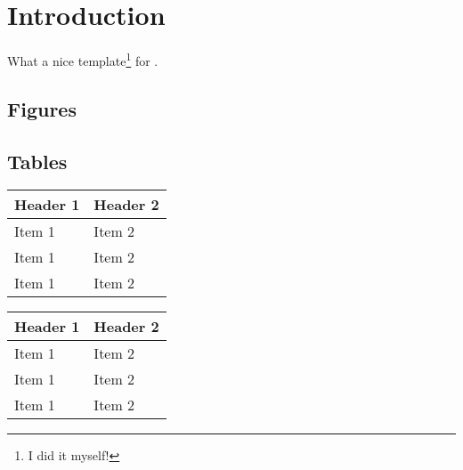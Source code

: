 \section*{Introduction}

What a nice template\footnote{I did it myself!} for \citep{Rougier:2017}.

\subsection*{Figures}

\begin{figure}[htbp]
    \label{fig:1}
\end{figure}

\subsection*{Tables}
\begin{table}[htbp]
\begin{minipage}{.45\textwidth}
  \begin{tabularx}{\textwidth}{|XX|}
      \hline
      \bfseries Header 1 & \bfseries Header 2\\
      \hline
      Item 1 & Item 2\\
      Item 1 & Item 2\\
      Item 1 & Item 2\\
      \hline
    \end{tabularx}
    \label{tab:1}
\end{minipage}
\hfill
\begin{minipage}{.45\textwidth}
  \begin{tabularx}{\textwidth}{|XX|}
      \hline
      \bfseries Header 1 & \bfseries Header 2\\
      \hline
      Item 1 & Item 2\\
      Item 1 & Item 2\\
      Item 1 & Item 2\\
      \hline
    \end{tabularx}
    \label{tab:2}
\end{minipage}
\end{table}

